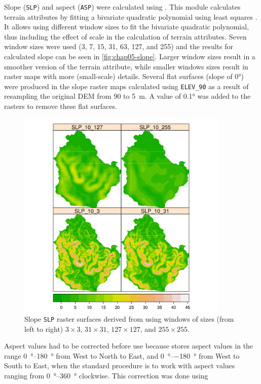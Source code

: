 Slope (\texttt{SLP}) and aspect (\texttt{ASP}) were calculated using . This module 
calculates 
terrain attributes by fitting a bivariate quadratic polynomial using least squares \cite{Wood1996}. It allows 
using different window sizes to fit the bivariate quadratic polynomial, thus including the effect of scale in 
the calculation of terrain attributes. Seven window sizes were used (3, 7, 15, 31, 63, 127, and 255) and the 
results for calculated slope can be seen in \autoref{fig:chap05-slope}. Larger window sizes result in a 
smoother version of the terrain attribute, while smaller windows sizes result in raster maps with more 
(small-scale) details. Several flat surfaces (slope of \ang{0}) were produced in the slope raster maps 
calculated using \texttt{ELEV\_90} as a result of resampling the original DEM from \num{90} to \SI{5}{\m}. A 
value of \ang{0.1} was added to the rasters to remove these flat surfaces.

\begin{figure}[!ht]
\centering
\includegraphics[width = 0.90\textwidth]{fig/chap05-slope}
\caption[Slope derived using windows of different sizes.]{Slope \texttt{SLP} raster surfaces derived from 
\demNew{} using windows of sizes (from left to right) $3 \times 3$, $31 \times 31$, $127 \times 127$, and $255 
\times 255$.}
\label{fig:chap05-slope}
\end{figure}

Aspect values had to be corrected before use because  stores aspect values in the range 
\SIrange{0}{+180}{\degree} from West to North to East, and \SIrange{0}{-180}{\degree} from West to South to 
East, when the standard procedure is to work with aspect values ranging from \SIrange{0}{360}{\degree} 
clockwise. This correction was done using

